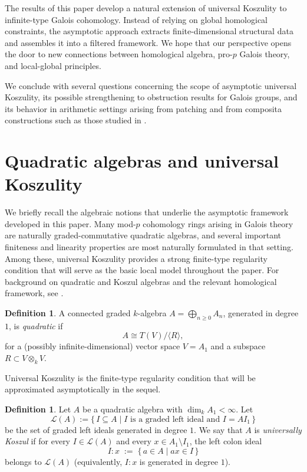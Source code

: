 \documentclass[11pt]{amsart}
\numberwithin{equation}{section}
\theoremstyle{definition}
\newtheorem{definition}[theorem]{Definition}
\begin{document}
	
	
	The results of this paper develop a natural extension of universal Koszulity to infinite-type Galois cohomology. Instead of relying on global homological constraints, the asymptotic approach extracts finite-dimensional structural data and assembles it into a filtered framework. We hope that our perspective opens the door to new connections between homological algebra, pro-$p$ Galois theory, and local-global principles.	
	
	We conclude with several questions concerning the scope of asymptotic universal Koszulity, its possible strengthening to obstruction results for Galois groups, and its behavior in arithmetic settings arising from patching and from composita constructions such as those studied in \cite{PalaistiComposita}.	
	
	
	\section{Quadratic algebras and universal Koszulity}
	
	
	We briefly recall the algebraic notions that underlie the asymptotic framework developed in this paper. Many mod-$p$ cohomology rings arising in Galois theory are naturally graded-commutative quadratic algebras, and several important finiteness and linearity properties are most naturally formulated in that setting. Among these, universal Koszulity provides a strong finite-type regularity condition that will serve as the basic local model throughout the paper. For background on quadratic and Koszul algebras and the relevant homological framework, see \cite{Froberg,PolishchukPositselski,Weibel}.
	
	\begin{definition}
		A connected graded \(k\)-algebra \(A = \displaystyle \bigoplus_{n\geq 0} A_n\), generated in degree \(1\), is \emph{quadratic} if \[ A \cong T(V)/\langle R \rangle, \] for a (possibly infinite-dimensional) vector space \(V = A_1\) and a subspace \(R \subset V \otimes_k V\).
	\end{definition}
	
	Universal Koszulity is the finite-type regularity condition that will be approximated asymptotically in the sequel.
	
	\begin{definition}\label{def:UK}
		Let \(A\) be a quadratic algebra with \(\dim_k A_1 < \infty\). Let
		\[ \mathcal L(A) := \{\, I\subseteq A \mid I \text{ is a graded left ideal and } I = A I_1\,\}\] be the set of graded left ideals generated in degree \(1\). We say that \(A\) is \emph{universally Koszul} if for every \(I\in\mathcal L(A)\) and every \(x \in A_1 \setminus I_1\), the left colon ideal \[ I:x \;:=\; \{\,a \in A \mid ax \in I\,\}\] 	belongs to \(\mathcal L(A)\) (equivalently, \(I:x\) is generated in degree \(1\)).
	\end{definition}
	
\end{document}
